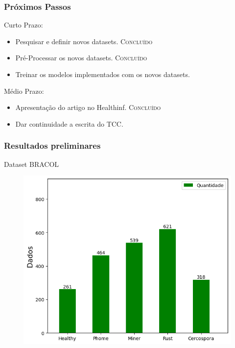 \documentclass[aspectratio=169]{beamer}
\begin{document}
\begin{frame}
    \frametitle{Próximos Passos}

    \begin{block}{Curto Prazo:}

        \begin{itemize}
            \item Pesquisar e definir novos datasets. \textsc{Concluído}
            \item Pré-Processar os novos datasets. \textsc{Concluído}
            \item Treinar os modelos implementados com os novos datasets.
        \end{itemize}

    \end{block}



    \begin{block}{Médio Prazo:}

        \begin{itemize}
            \item Apresentação do artigo no Healthinf. \textsc{Concluído}
            \item Dar continuidade a escrita do TCC.
        \end{itemize}

    \end{block}




\end{frame}




\begin{frame}
    \frametitle{Resultados preliminares}


    \centering
    Dataset BRACOL

    \begin{figure}
        \centering
        \includegraphics[scale = 0.5]{img/bracol data.png}
        \label{fig:enter-label}
    \end{figure}

\end{frame}
\end{document}
